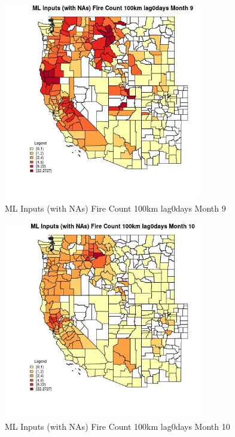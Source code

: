 \begin{figure} 
\centering  
\includegraphics[width=0.77\textwidth]{Code_Outputs/Report_ML_input_PM25_Step4_part_f_de_duplicated_aves_prioritize_24hr_obswNAs_CountyFire_Count_100km_lag0daysmedianMonth9.jpg} 
\caption{\label{fig:Report_ML_input_PM25_Step4_part_f_de_duplicated_aves_prioritize_24hr_obswNAsCountyFire_Count_100km_lag0daysmedianMonth9}ML Inputs (with NAs) Fire Count 100km lag0days Month 9} 
\end{figure} 
 

\begin{figure} 
\centering  
\includegraphics[width=0.77\textwidth]{Code_Outputs/Report_ML_input_PM25_Step4_part_f_de_duplicated_aves_prioritize_24hr_obswNAs_CountyFire_Count_100km_lag0daysmedianMonth10.jpg} 
\caption{\label{fig:Report_ML_input_PM25_Step4_part_f_de_duplicated_aves_prioritize_24hr_obswNAsCountyFire_Count_100km_lag0daysmedianMonth10}ML Inputs (with NAs) Fire Count 100km lag0days Month 10} 
\end{figure} 
 

